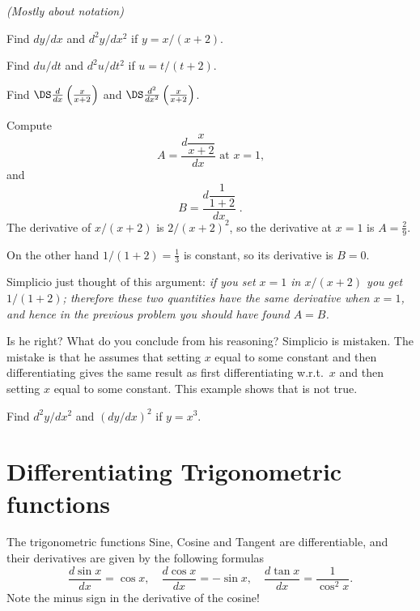 \begin{multicols}{2}
\problem \groupproblem \textit{(Mostly about notation)}

\subprob  Find $dy/dx$ and $d^2y/dx^2$ if $y= x/( x+2)$.  

\subprob  Find $du/dt$ and $d^2u/dt^2$ if $u= t/(t+2)$. 

\subprob  Find $\DS \frac{d}{dx}\left(\frac x{x+2}\right)$ and
$\DS\frac{d^2}{dx^2}\left(\frac x{x+2}\right)$.  

\subprob  Compute
\[
A= \frac{d\dfrac{x} {x+2}} {dx} \text{ at $x=1$,}
\]
and
\[
B= \frac{d\dfrac{1} {1+2}} {dx}\;.
\]
\answer
The derivative of $x/(x+2)$ is $2/(x+2)^2$, so the derivative at $x=1$ is
$A = \frac29$.

On the other hand
$1/(1+2) = \frac13$ is constant, so its derivative is $B=0$.
\endanswer

\subprob Simplicio just thought of this argument:
\textit{if you set $x=1$ in $x/(x+2)$ you get
$1/(1+2)$; therefore these two quantities have the same derivative when
$x=1$, and hence in the previous problem you should have found $A=B$. }

Is he right?  What do you conclude from his reasoning?
\answer
Simplicio is mistaken.  The mistake is that he assumes that setting $x$
equal to some constant and then differentiating gives the same result as first
differentiating w.r.t.~$x$ and then setting $x$ equal to some constant.  This
example shows that is not true.
\endanswer


\problem  \label{ex:d2ydx2dydx2} Find $d^2y/dx^2$ and
$(dy/dx)^2$ if $y=x^3$.





\end{multicols}
\noproblemfont
\section{Differentiating Trigonometric functions}
\label{sec:trigDerivatives}
The trigonometric functions Sine, Cosine and Tangent are differentiable, and
their derivatives are given by the following formulas
\begin{equation}
  \frac{d\sin x}{dx} = \cos x,\quad
  \frac{d\cos x}{dx} = -\sin x,\quad
  \frac{d\tan x}{dx} = \frac1{\cos^2 x}.
\end{equation}
Note the minus sign in the derivative of the cosine!

